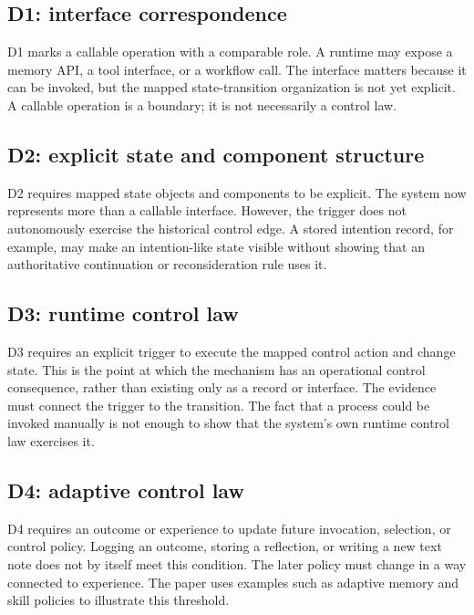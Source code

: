 \subsection{D1: interface correspondence}

D1 marks a callable operation with a comparable role. A runtime may expose a memory API, a tool interface, or a workflow call. The interface matters because it can be invoked, but the mapped state-transition organization is not yet explicit. A callable operation is a boundary; it is not necessarily a control law.

\subsection{D2: explicit state and component structure}

D2 requires mapped state objects and components to be explicit. The system now represents more than a callable interface. However, the trigger does not autonomously exercise the historical control edge. A stored intention record, for example, may make an intention-like state visible without showing that an authoritative continuation or reconsideration rule uses it.

\subsection{D3: runtime control law}

D3 requires an explicit trigger to execute the mapped control action and change state. This is the point at which the mechanism has an operational control consequence, rather than existing only as a record or interface. The evidence must connect the trigger to the transition. The fact that a process could be invoked manually is not enough to show that the system's own runtime control law exercises it.

\subsection{D4: adaptive control law}

D4 requires an outcome or experience to update future invocation, selection, or control policy. Logging an outcome, storing a reflection, or writing a new text note does not by itself meet this condition. The later policy must change in a way connected to experience. The paper uses examples such as adaptive memory and skill policies to illustrate this threshold.

